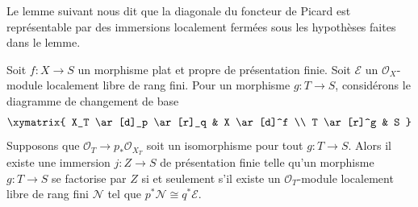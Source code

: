 \noindent
Le lemme suivant nous dit que la diagonale du foncteur de Picard
est représentable par des immersions localement fermées sous
les hypothèses faites dans le lemme.

\begin{lemma}
\label{lemma-diagonal-picard-flat-proper}
Soit $f : X \to S$ un morphisme plat et propre de présentation finie.
Soit $\mathcal{E}$ un $\mathcal{O}_X$-module localement libre de rang fini.
Pour un morphisme $g : T \to S$, considérons le diagramme de changement de base
$$
\xymatrix{
X_T \ar[d]_p \ar[r]_q & X \ar[d]^f \\
T \ar[r]^g & S
}
$$
Supposons que $\mathcal{O}_T \to p_*\mathcal{O}_{X_T}$ soit un
isomorphisme pour tout $g : T \to S$. Alors il existe une
immersion $j : Z \to S$ de présentation finie telle qu'un
morphisme $g : T \to S$ se factorise par $Z$ si et seulement s'il
existe un $\mathcal{O}_T$-module localement libre de rang fini $\mathcal{N}$
tel que $p^*\mathcal{N} \cong q^*\mathcal{E}$.
\end{lemma}


